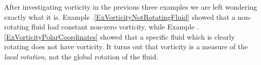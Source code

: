 \documentclass[12pt]{book}
\begin{document}
After investigating vorticity in the previous three examples we are left wondering exactly what it is.  Example \thechapter.\ref{ExVorticityNotRotatingFluid} showed that a non-rotating fluid had constant non-zero vorticity, while Example \thechapter.\ref{ExVorticityPolarCoordinates} showed that a specific fluid which is clearly rotating does not have vorticity.  It turns out that vorticity is a measure of the \textit{local rotation}, not the global rotation of the fluid.
\end{document}

